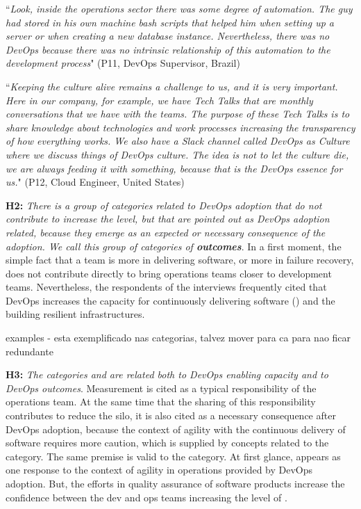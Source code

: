 \begin{mq}
``\emph{Look, inside the operations sector there was some degree of automation. The guy
had stored in his own machine bash scripts that helped him when setting up a
server or when creating a new database instance. Nevertheless, there was no DevOps
because there was no intrinsic relationship of this automation to the
development process}" (P11, DevOps Supervisor, Brazil)
\end{mq}


\begin{mq}
``\emph{Keeping the culture alive remains a challenge to us, and it is very
important. Here in our company, for example, we have Tech Talks that are
monthly conversations that we have with the teams. The purpose of these Tech
Talks is to share knowledge about technologies and work processes increasing the
transparency of how everything works. We also have a Slack channel called
DevOps as Culture where we discuss things of DevOps culture. The idea is not to
let the culture die, we are always feeding it with something, because that is
the DevOps essence for us.}" (P12, Cloud Engineer, United States)
\end{mq}

\textbf{H2:} \textit{There is a group of categories related to DevOps adoption
that do not contribute to increase the  level, but that are
pointed out as DevOps adoption related, because they emerge as an expected or
necessary consequence of the adoption. We call this group of categories of
\textbf{outcomes}}. In a first moment, the simple fact that a team is more
 in delivering software, or more  in failure recovery, does not
contribute directly to bring operations teams closer to development teams.
Nevertheless, the respondents of the interviews frequently cited that DevOps
increases the capacity for continuously delivering software ()
and the building resilient infrastructures.

{\color{red}examples - esta exemplificado nas categorias, talvez mover para ca
para nao ficar redundante}

\textbf{H3:} \textit{The categories  and 
are related both to DevOps enabling capacity and to DevOps outcomes}.
Measurement is cited as a typical responsibility of the operations team.
At the same time that the sharing of this responsibility contributes to reduce the silo,
it is also cited as a necessary consequence after DevOps adoption, because
the context of agility with the continuous delivery of software requires more caution,
which is supplied by concepts related to the  category.
The same premise is valid to the  category. At first glance,
 appears as one response to the context of agility in operations
provided by DevOps adoption. But, the efforts in quality assurance of software products
increase the confidence between the dev and ops teams increasing the level
of .

